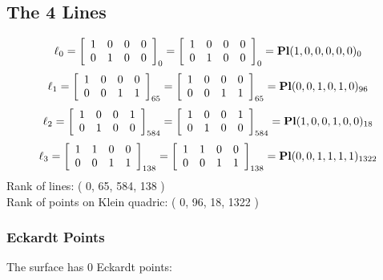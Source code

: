 \documentclass{article}
\begin{document}
{\subsection*{The 4 Lines}
$$
\ell_{0} = 
\left[
\begin{array}{*{4}{r}}
1 & 0 & 0 & 0\\
0 & 1 & 0 & 0\\
\end{array}
\right]
_{0}
=
\left[
\begin{array}{*{4}c}
1  & 0  & 0  & 0\\
0  & 1  & 0  & 0\\
\end{array}
\right]_{0}
={\rm\bf Pl}(1,0,0,0,0,0 )_{0}$$
$$
\ell_{1} = 
\left[
\begin{array}{*{4}{r}}
1 & 0 & 0 & 0\\
0 & 0 & 1 & 1\\
\end{array}
\right]
_{65}
=
\left[
\begin{array}{*{4}c}
1  & 0  & 0  & 0\\
0  & 0  & 1  & 1\\
\end{array}
\right]_{65}
={\rm\bf Pl}(0,0,1,0,1,0 )_{96}$$
$$
\ell_{2} = 
\left[
\begin{array}{*{4}{r}}
1 & 0 & 0 & 1\\
0 & 1 & 0 & 0\\
\end{array}
\right]
_{584}
=
\left[
\begin{array}{*{4}c}
1  & 0  & 0  & 1\\
0  & 1  & 0  & 0\\
\end{array}
\right]_{584}
={\rm\bf Pl}(1,0,0,1,0,0 )_{18}$$
$$
\ell_{3} = 
\left[
\begin{array}{*{4}{r}}
1 & 1 & 0 & 0\\
0 & 0 & 1 & 1\\
\end{array}
\right]
_{138}
=
\left[
\begin{array}{*{4}c}
1  & 1  & 0  & 0\\
0  & 0  & 1  & 1\\
\end{array}
\right]_{138}
={\rm\bf Pl}(0,0,1,1,1,1 )_{1322}$$
Rank of lines: ( 0, 65, 584, 138 )\\
Rank of points on Klein quadric: ( 0, 96, 18, 1322 )\\
\subsubsection*{Eckardt Points}
The surface has 0 Eckardt points:\\
}
\end{document}
